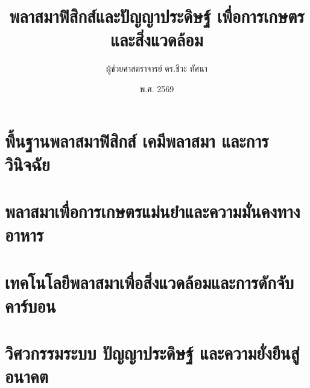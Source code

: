 \documentclass[11pt,twoside,openright]{book}
\title{พลาสมาฟิสิกส์และปัญญาประดิษฐ์ เพื่อการเกษตรและสิ่งแวดล้อม}
\author{ผู้ช่วยศาสตราจารย์ ดร.ชีวะ ทัศนา}
\date{พ.ศ. 2569}
\begin{document}
\frontmatter







\tableofcontents
\clearpage
\listoffigures
\clearpage
\listoftables
\cleardoublepage

\mainmatter

\part{พื้นฐานพลาสมาฟิสิกส์ เคมีพลาสมา และการวินิจฉัย}




\part{พลาสมาเพื่อการเกษตรแม่นยำและความมั่นคงทางอาหาร}




\part{เทคโนโลยีพลาสมาเพื่อสิ่งแวดล้อมและการดักจับคาร์บอน}




\part{วิศวกรรมระบบ ปัญญาประดิษฐ์ และความยั่งยืนสู่อนาคต}



\appendix
\renewcommand{\chaptertitlename}{ภาคผนวก}
\renewcommand{\appendixname}{ภาคผนวก}
\newcommand{\thaialph}[1]{\ifcase#1\or ก\or ข\or ค\or ง\or จ\or ฉ\or ช\or ซ\or ฌ\or ญ\fi}
\renewcommand{\thechapter}{\thaialph{\value{chapter}}}
\end{document}
